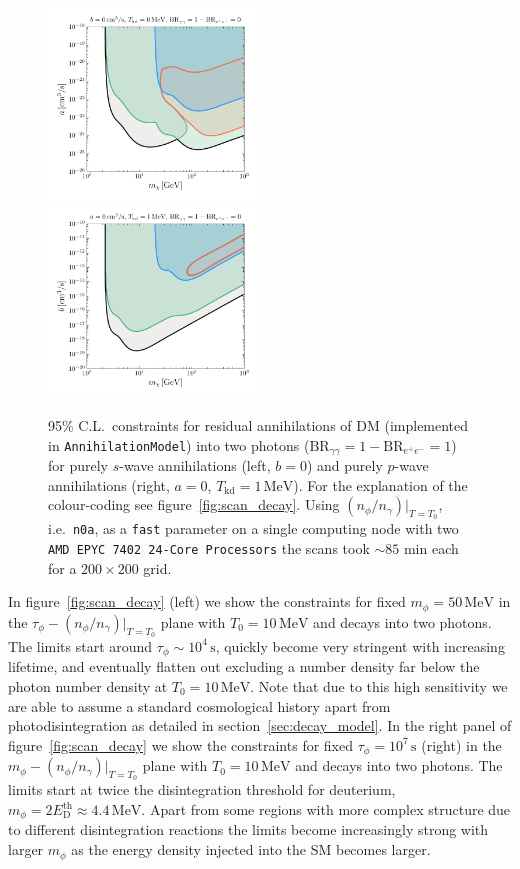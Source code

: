 \documentclass[11pt,a4paper]{article}
\begin{document}
\begin{figure}
	\centering
	\includegraphics[width=0.495\textwidth]{plots/annih_swave.pdf}
	\includegraphics[width=0.495\textwidth]{plots/annih_pwave_1MeV.pdf}
	\caption{95\% C.L.\ constraints for residual annihilations of DM (implemented in \texttt{AnnihilationModel}) into two photons ($\text{BR}_{\gamma \gamma} = 1 - \text{BR}_{e^+ e^-} = 1$) for purely $s$-wave annihilations (left, $b = 0$) and purely $p$-wave annihilations (right, $a = 0$, $T_\mathrm{kd} = 1 \, \mathrm{MeV}$). For the explanation of the colour-coding see figure~\ref{fig:scan_decay}. Using $(n_\phi/n_\gamma)|_{T=T_0}$, i.e.\ \texttt{n0a}, as a \texttt{fast} parameter on a single computing node with two \texttt{AMD EPYC 7402 24-Core Processors} the scans took $\sim 85$ min each for a $200 \times 200$ grid.}
	\label{fig:scan_annih}
\end{figure}

In figure~\ref{fig:scan_decay} (left) we show the constraints for fixed $m_\phi = 50 \, \mathrm{MeV}$ in the $\tau_\phi - (n_\phi/n_\gamma)|_{T=T_0}$ plane with $T_0 = 10 \, \mathrm{MeV}$ and decays into two photons. The limits start around $\tau_\phi \sim 10^4 \, \mathrm{s}$, quickly become very stringent with increasing lifetime, and eventually flatten out excluding a number density far below the photon number density at $T_0 = 10 \, \mathrm{MeV}$. Note that due to this high sensitivity we are able to assume a standard cosmological history apart from photodisintegration as detailed in section~\ref{sec:decay_model}.
In the right panel of figure~\ref{fig:scan_decay} we show the constraints for fixed $\tau_\phi = 10^7 \, \mathrm{s}$ (right) in the $m_\phi - (n_\phi/n_\gamma)|_{T=T_0}$ plane with $T_0 = 10 \, \mathrm{MeV}$ and decays into two photons. The limits start at twice the disintegration threshold for deuterium, $m_\phi = 2 E_\mathrm{D}^\mathrm{th} \approx 4.4 \, \mathrm{MeV}$. Apart from some regions with more complex structure due to different disintegration reactions the limits become increasingly strong with larger $m_\phi$ as the energy density injected into the SM becomes larger.
\end{document}
